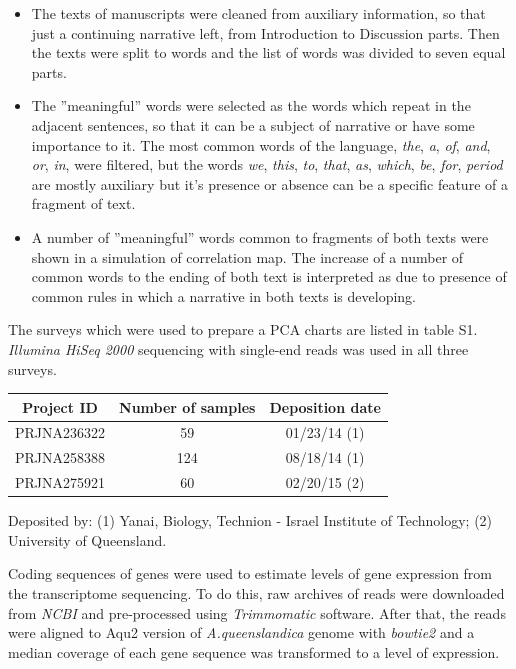 \documentclass[12pt,aps]{revtex4}
\begin{document}
\begin{itemize}

\item The texts of manuscripts were cleaned from auxiliary information, so that just a continuing narrative left, from Introduction to Discussion parts. Then the texts were split to words and the list of words was divided to seven equal parts.

\item The ''meaningful'' words were selected as the words which repeat in the adjacent sentences, so that it can be a subject of narrative or have some importance to it. The most common words of the language, \textit{the}, \textit{a}, \textit{of}, \textit{and}, \textit{or}, \textit{in}, were filtered, but the words \textit{we}, \textit{this}, \textit{to}, \textit{that}, \textit{as}, \textit{which},  \textit{be}, \textit{for}, \textit{period} are mostly auxiliary but it's presence or absence can be a specific feature of a fragment of text.

\item A number of ''meaningful'' words common to fragments of both texts were shown in a simulation of correlation map. The increase of a number of common words to the ending of both text is interpreted as due to presence of common rules in which a narrative in both texts is developing.

\end{itemize}

The surveys which were used to prepare a PCA charts are listed in table S1.  \textit{Illumina HiSeq 2000} sequencing with single-end reads was used in all three surveys.

\begin{table}[h] \label{table1}
\begin{center}
\begin{tabular} {|c|c|c|}
\hline
Project ID&Number of samples&Deposition date\\
\hline
PRJNA236322&59&01/23/14 (1)\\
PRJNA258388&124&08/18/14 (1)\\
PRJNA275921&60&02/20/15 (2)\\
\hline
\end{tabular}
\end{center}
{\small Deposited by: (1) Yanai, Biology, Technion - Israel Institute of Technology;
(2) University of Queensland.} 
\end{table}

Coding sequences of genes were used to estimate levels of gene expression from the transcriptome sequencing. To do this, raw archives of reads were downloaded from \textit{NCBI} and pre-processed using \textit{Trimmomatic} software. After that, the reads were aligned to Aqu2 version of \textit{A.queenslandica} genome with \textit{bowtie2} and a median coverage of each gene sequence was transformed to a level of expression. 
\end{document}
